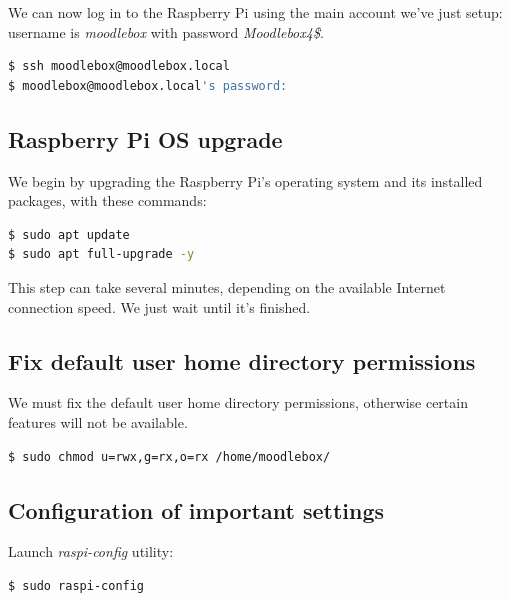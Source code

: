 \documentclass[12pt]{article}
\begin{document}
We can now log in to the Raspberry Pi using the main account we've just setup: username is \emph{moodlebox} with password \emph{Moodlebox4\$}.

\begin{lstlisting}[language=bash]
$ ssh moodlebox@moodlebox.local
$ moodlebox@moodlebox.local's password:
\end{lstlisting}

\subsection{Raspberry Pi OS upgrade}

We begin by upgrading the Raspberry Pi's operating system and its installed packages, with these commands:
\begin{lstlisting}[language=bash]
$ sudo apt update
$ sudo apt full-upgrade -y
\end{lstlisting}

This step can take several minutes, depending on the available Internet connection speed.
We just wait until it's finished.

\subsection{Fix default user home directory permissions}

We must fix the default user home directory permissions, otherwise certain features will not be available.

\begin{lstlisting}[language=bash]
$ sudo chmod u=rwx,g=rx,o=rx /home/moodlebox/
\end{lstlisting}

\subsection{Configuration of important settings}

Launch \emph{raspi-config} utility:
\begin{lstlisting}[language=bash]
$ sudo raspi-config
\end{lstlisting}
\end{document}
